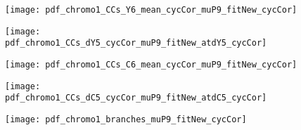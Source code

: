 
\begin{figure}
	\centering
	\texttt{[image: pdf\_chromo1\_CCs\_Y6\_mean\_cycCor\_muP9\_fitNew\_cycCor]}
	\clearpage %
	\label{fig:XXX:XXX}
\end{figure}	

\clearpage



\begin{figure}
	\centering
	\texttt{[image: pdf\_chromo1\_CCs\_dY5\_cycCor\_muP9\_fitNew\_atdY5\_cycCor]}
	\clearpage %
	\label{fig:XXX:XXX}
\end{figure}	

\clearpage



\begin{figure}
	\centering
	\texttt{[image: pdf\_chromo1\_CCs\_C6\_mean\_cycCor\_muP9\_fitNew\_cycCor]}
	\clearpage %
	\label{fig:XXX:XXX}
\end{figure}	

\clearpage



\begin{figure}
	\centering
	\texttt{[image: pdf\_chromo1\_CCs\_dC5\_cycCor\_muP9\_fitNew\_atdC5\_cycCor]}
	\clearpage %
	\label{fig:XXX:XXX}
\end{figure}	

\clearpage



\begin{figure}
	\centering
	\texttt{[image: pdf\_chromo1\_branches\_muP9\_fitNew\_cycCor]}
	\clearpage %
	\label{fig:XXX:XXX}
\end{figure}	

